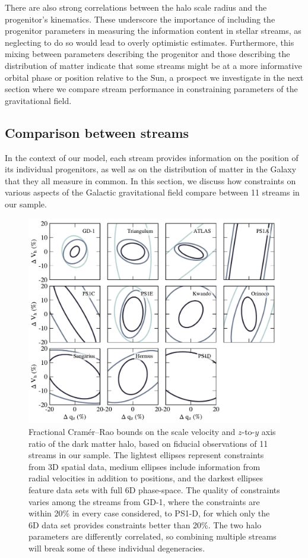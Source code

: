 \documentclass[modern]{aastex61}
\begin{document}
There are also strong correlations between the halo scale radius and the progenitor's kinematics.
These underscore the importance of including the progenitor parameters in measuring the information content in stellar streams, as neglecting to do so would lead to overly optimistic estimates.
Furthermore, this mixing between parameters describing the progenitor and those describing the distribution of matter indicate that some streams might be at a more informative orbital phase or position relative to the Sun, a prospect we investigate in the next section where we compare stream performance in constraining parameters of the gravitational field.

\subsection{Comparison between streams}
\label{sec:res_comp}
In the context of our model, each stream provides information on the position of its individual progenitors, as well as on the distribution of matter in the Galaxy that they all measure in common.
In this section, we discuss how constraints on various aspects of the Galactic gravitational field compare between 11 streams in our sample.

\begin{figure}
\begin{center}
\includegraphics[width=\textwidth]{crb2d_allstream.pdf}
\caption{Fractional Cram\'er--Rao bounds on the scale velocity and $z$-to-$y$ axis ratio of the dark matter halo, based on fiducial observations of 11 streams in our sample.
The lightest ellipses represent constraints from 3D spatial data, medium ellipses include information from radial velocities in addition to positions, and the darkest ellipses feature data sets with full 6D phase-space.
The quality of constraints varies among the streams from GD-1, where the constraints are within 20\% in every case considered, to PS1-D, for which only the 6D data set provides constraints better than 20\%.
The two halo parameters are differently correlated, so combining multiple streams will break some of these individual degeneracies.
}
\label{fig:crb2d_comparison}
\end{center}
\end{figure}
\end{document}
